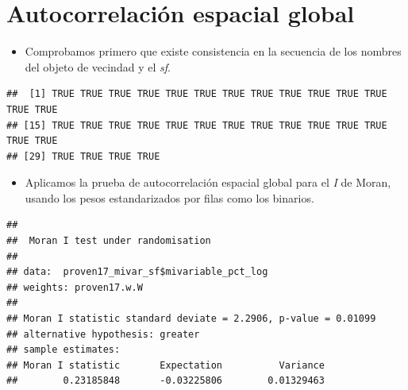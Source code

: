 \documentclass[11pt,]{article}
\newenvironment{Shaded}{\begin{snugshade}}{\end{snugshade}}
\newcommand{\KeywordTok}[1]{\textcolor[rgb]{0.13,0.29,0.53}{\textbf{#1}}}
\newcommand{\DataTypeTok}[1]{\textcolor[rgb]{0.13,0.29,0.53}{#1}}
\newcommand{\DecValTok}[1]{\textcolor[rgb]{0.00,0.00,0.81}{#1}}
\newcommand{\StringTok}[1]{\textcolor[rgb]{0.31,0.60,0.02}{#1}}
\newcommand{\OperatorTok}[1]{\textcolor[rgb]{0.81,0.36,0.00}{\textbf{#1}}}
\newcommand{\NormalTok}[1]{#1}
\providecommand{\tightlist}{%
\setlength{\itemsep}{0pt}\setlength{\parskip}{0pt}}
\begin{document}
\section{Autocorrelación espacial
global}\label{autocorrelaciuxf3n-espacial-global}

\begin{itemize}
\tightlist
\item
  Comprobamos primero que existe consistencia en la secuencia de los
  nombres del objeto de vecindad y el \emph{sf}.
\end{itemize}

\begin{Shaded}
\end{Shaded}

\begin{verbatim}
##  [1] TRUE TRUE TRUE TRUE TRUE TRUE TRUE TRUE TRUE TRUE TRUE TRUE TRUE TRUE
## [15] TRUE TRUE TRUE TRUE TRUE TRUE TRUE TRUE TRUE TRUE TRUE TRUE TRUE TRUE
## [29] TRUE TRUE TRUE TRUE
\end{verbatim}

\begin{itemize}
\tightlist
\item
  Aplicamos la prueba de autocorrelación espacial global para el
  \emph{I} de Moran, usando los pesos estandarizados por filas como los
  binarios.
\end{itemize}

\begin{Shaded}
\end{Shaded}

\begin{verbatim}
## 
##  Moran I test under randomisation
## 
## data:  proven17_mivar_sf$mivariable_pct_log  
## weights: proven17.w.W    
## 
## Moran I statistic standard deviate = 2.2906, p-value = 0.01099
## alternative hypothesis: greater
## sample estimates:
## Moran I statistic       Expectation          Variance 
##        0.23185848       -0.03225806        0.01329463
\end{verbatim}
\end{document}
